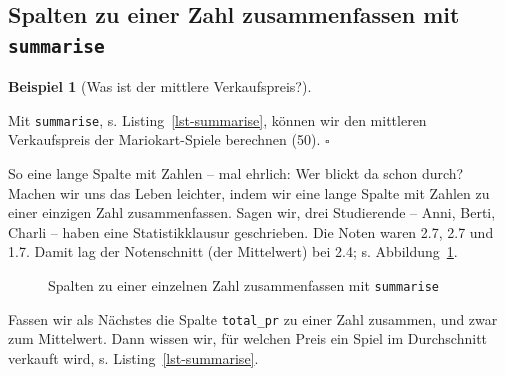 \documentclass[
  letterpaper,
  twoside,
  open=any]{scrbook}
\theoremstyle{definition}
\theoremstyle{definition}
\newtheorem{example}{Beispiel}[chapter]
\theoremstyle{definition}
\theoremstyle{remark}
\begin{document}
\subsection{\texorpdfstring{Spalten zu einer Zahl zusammenfassen mit
\texttt{summarise}}{Spalten zu einer Zahl zusammenfassen mit summarise}}\label{spalten-zu-einer-zahl-zusammenfassen-mit-summarise}

\begin{example}[Was ist der mittlere
Verkaufspreis?]\protect\hypertarget{exm-summarise}{}\label{exm-summarise}

Mit \texttt{summarise}, s. Listing~\ref{lst-summarise}, können wir den
mittleren Verkaufspreis der Mariokart-Spiele berechnen (50). \(\square\)

\end{example}

So eine lange Spalte mit Zahlen -- mal ehrlich: Wer blickt da schon
durch? Machen wir uns das Leben leichter, indem wir eine lange Spalte
mit Zahlen zu einer einzigen Zahl zusammenfassen. Sagen wir, drei
Studierende -- Anni, Berti, Charli -- haben eine Statistikklausur
geschrieben. Die Noten waren 2.7, 2.7 und 1.7. Damit lag der
Notenschnitt (der Mittelwert) bei 2.4; s. Abbildung~\ref{fig-summarise}.

\begin{figure}


\caption{\label{fig-summarise}Spalten zu einer einzelnen Zahl
zusammenfassen mit \texttt{summarise}}

\end{figure}%

Fassen wir als Nächstes die Spalte \texttt{total\_pr} zu einer Zahl
zusammen, und zwar zum Mittelwert. Dann wissen wir, für welchen Preis
ein Spiel im Durchschnitt verkauft wird, s. Listing~\ref{lst-summarise}.
\end{document}
